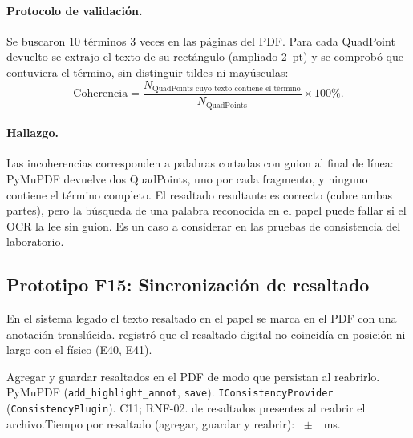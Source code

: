 \paragraph{Protocolo de validación.} Se buscaron 10 términos 3 veces en las \FCatorcePaginas{} páginas del PDF. Para cada QuadPoint devuelto se extrajo el texto de su rectángulo (ampliado 2~pt) y se comprobó que contuviera el término, sin distinguir tildes ni mayúsculas:
\begin{equation}
\mathrm{Coherencia}=\frac{N_{\text{QuadPoints cuyo texto contiene el término}}}{N_{\text{QuadPoints}}}\times100\%.
\end{equation}

\paragraph{Hallazgo.} Las incoherencias corresponden a palabras cortadas con guion al final de línea: PyMuPDF devuelve dos QuadPoints, uno por cada fragmento, y ninguno contiene el término completo. El resaltado resultante es correcto (cubre ambas partes), pero la búsqueda de una palabra reconocida en el papel puede fallar si el OCR la lee sin guion. Es un caso a considerar en las pruebas de consistencia del laboratorio.

\subsection{Prototipo F15: Sincronización de resaltado}

En el sistema legado el texto resaltado en el papel se marca en el PDF con una anotación translúcida. \citet{ibaceta2023} registró que el resaltado digital no coincidía en posición ni largo con el físico (E40, E41).

{Agregar y guardar resaltados en el PDF de modo que persistan al reabrirlo.}
{PyMuPDF (\texttt{add\_highlight\_annot}, \texttt{save}).}
{\texttt{IConsistencyProvider} (\texttt{ConsistencyPlugin}).}
{C11; RNF-02.}
{ \FQuincePersistidas{} de \FQuinceAnotaciones{} resaltados presentes al reabrir el archivo.\newline Tiempo por resaltado (agregar, guardar y reabrir): \FQuinceTiempoMs~$\pm$~\FQuinceTiempoSdMs~ms.\newline {}}

